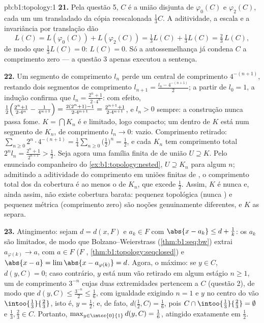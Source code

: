 \begin{solution}{pb:b1:topology:1}
\textbf{21.} Pela questão 5, $C$ é a união disjunta de
$\varphi_0(C)$ e $\varphi_2(C)$, cada um um transladado da
cópia reescalonada $\frac13 C$. A aditividade, a escala e a invariância
por translação dão
\[
L(C) = L(\varphi_0(C)) + L(\varphi_2(C))
= \tfrac13 L(C) + \tfrac13 L(C) = \tfrac23\,L(C),
\]
de modo que $\frac13 L(C) = 0$: $L(C) = 0$. Só a autossemelhança já
condena $C$ a comprimento zero --- a questão 3 apenas executou a
sentença.

\textbf{22.} Um segmento de comprimento $l_n$ perde um  central
de comprimento $4^{-(n+1)}$, restando dois segmentos de comprimento $l_{n+1}
= \frac{l_n - 4^{-(n+1)}}{2}$; a partir de $l_0 = 1$, a indução
confirma que $l_n = \frac{2^n + 1}{2\cdot4^n}$: com efeito,
$\frac12\Bigl(\frac{2^n+1}{2\cdot4^n} - \frac{1}{4^{n+1}}\Bigr)
= \frac{2(2^n + 1) - 1}{2\cdot4^{n+1}} = \frac{2^{n+1} +
1}{2\cdot4^{n+1}}$, e $l_n > 0$ sempre: a construção nunca
passa fome. $K = \bigcap K_n$ é  e limitado, logo compacto;
um  dentro de $K$ está num segmento de $K_n$, de comprimento
$l_n \to 0$:  vazio. Comprimento retirado: $\sum_{n\geq0} 2^n
\cdot 4^{-(n+1)} = \frac14\sum_{n\geq0}\bigl(\frac12\bigr)^n =
\frac12$, e cada $K_n$ tem comprimento total $2^n l_n = \frac{2^n +
1}{2^{n+1}} > \frac12$. Seja agora uma família finita de  
de união $U \supseteq K$. Pelo enunciado companheiro do
\cref{ex:b1:topology:nested}, $U \supseteq K_n$ para algum $n$;
admitindo a aditividade do comprimento em uniões finitas de ,
o comprimento total dos  da cobertura é ao menos o de
$K_n$, que excede $\frac12$. Assim, $K$ é nunca  e, ainda assim,
não existe cobertura barata: pequenez topológica (nunca ) e
pequenez métrica (comprimento zero) são noções genuinamente diferentes,
e $K$ as separa.

\textbf{23.} Atingimento: sejam $d = d(x, F)$ e $a_k \in F$
com $\abs{x - a_k} \leq d + \frac1k$: os $a_k$ são limitados, de modo que
Bolzano--Weierstrass (\cref{thm:b1:seq:bw}) extrai
$a_{\varphi(k)} \to a$, com $a \in F$ ($F$ ,
\cref{thm:b1:topology:seqclosed}) e $\abs{x - a} = \lim
\abs{x - a_{\varphi(k)}} = d$. Agora, o máximo: se $y \in C$,
$d(y, C) = 0$; caso contrário, $y$ está num vão retirado em algum estágio
$n \geq 1$, um   de comprimento $3^{-n}$ cujas duas
extremidades pertencem a $C$ (questão 2), de modo que $d(y, C) \leq
\frac{3^{-n}}{2} \leq \frac16$, com igualdade exigindo $n = 1$
e $y$ no centro do vão $\intoo{\frac13}{\frac23}$,
isto é, $y = \frac12$; e, de fato, $d\bigl(\frac12, C\bigr) =
\frac16$, pois $C \cap \intoo{\frac13}{\frac23} = \emptyset$ e
$\frac13, \frac23 \in C$. Portanto, $\max_{y\in\intcc{0}{1}} d(y, C)
= \frac16$, atingido exatamente em $\frac12$.


\end{solution}
